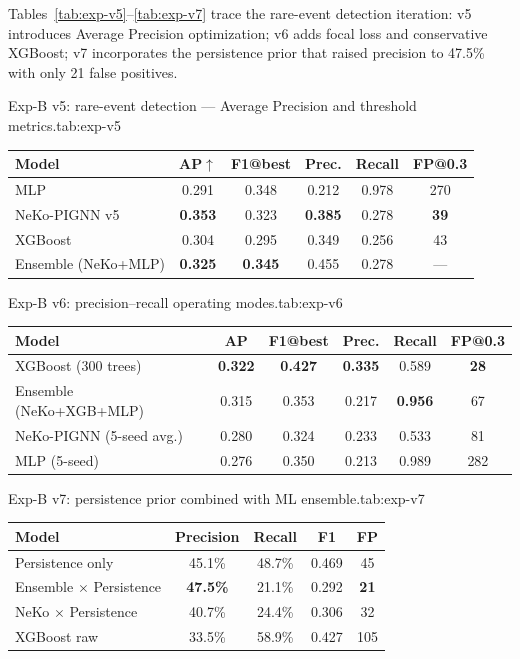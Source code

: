 Tables~\ref{tab:exp-v5}--\ref{tab:exp-v7} trace the rare-event detection iteration: v5 introduces Average Precision optimization; v6 adds focal loss and conservative XGBoost; v7 incorporates the persistence prior that raised precision to 47.5\% with only 21 false positives.

\begin{resulttable}{Exp-B v5: rare-event detection --- Average Precision and threshold metrics.}{tab:exp-v5}
\begin{tabular}{@{}lccccc@{}}
\toprule
\textbf{Model} & \textbf{AP}$\uparrow$ & \textbf{F1@best} & \textbf{Prec.} & \textbf{Recall} & \textbf{FP@0.3} \\
\midrule
MLP & 0.291 & 0.348 & 0.212 & 0.978 & 270 \\
NeKo-PIGNN v5 & \textbf{0.353} & 0.323 & \textbf{0.385} & 0.278 & \textbf{39} \\
XGBoost & 0.304 & 0.295 & 0.349 & 0.256 & 43 \\
Ensemble (NeKo+MLP) & \textbf{0.325} & \textbf{0.345} & 0.455 & 0.278 & --- \\
\bottomrule
\end{tabular}
\end{resulttable}

\begin{resulttable}{Exp-B v6: precision--recall operating modes.}{tab:exp-v6}
\begin{tabular}{@{}lccccc@{}}
\toprule
\textbf{Model} & \textbf{AP} & \textbf{F1@best} & \textbf{Prec.} & \textbf{Recall} & \textbf{FP@0.3} \\
\midrule
XGBoost (300 trees) & \textbf{0.322} & \textbf{0.427} & \textbf{0.335} & 0.589 & \textbf{28} \\
Ensemble (NeKo+XGB+MLP) & 0.315 & 0.353 & 0.217 & \textbf{0.956} & 67 \\
NeKo-PIGNN (5-seed avg.) & 0.280 & 0.324 & 0.233 & 0.533 & 81 \\
MLP (5-seed) & 0.276 & 0.350 & 0.213 & 0.989 & 282 \\
\bottomrule
\end{tabular}
\end{resulttable}

\begin{resulttable}{Exp-B v7: persistence prior combined with ML ensemble.}{tab:exp-v7}
\begin{tabular}{@{}lcccc@{}}
\toprule
\textbf{Model} & \textbf{Precision} & \textbf{Recall} & \textbf{F1} & \textbf{FP} \\
\midrule
Persistence only & 45.1\% & 48.7\% & 0.469 & 45 \\
Ensemble $\times$ Persistence & \textbf{47.5\%} & 21.1\% & 0.292 & \textbf{21} \\
NeKo $\times$ Persistence & 40.7\% & 24.4\% & 0.306 & 32 \\
XGBoost raw & 33.5\% & 58.9\% & 0.427 & 105 \\
\bottomrule
\end{tabular}
\end{resulttable}

